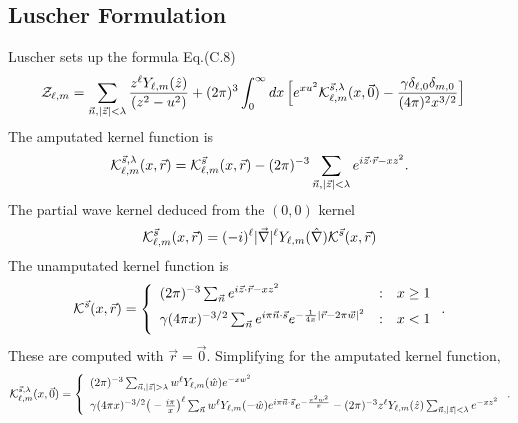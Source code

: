 \documentclass[a4paper]{article}
\begin{document}
\subsection{Luscher Formulation}

Luscher sets up the formula Eq.(C.8)
\begin{align}
 {\cal Z}_{\ell,m}
 &= \sum_{\vec{n},|\vec{z}|<\lambda} \frac{ z^{\ell} Y_{\ell,m}(\hat{z}) }{ (z^{2} - u^{2}) }
 + (2\pi)^{3} \int_{0}^{\infty} dx \,
 \Big[ e^{x u^{2}} {\cal K}_{\ell,m}^{\vec{s},\lambda}(x,\vec{0})
 - \frac{ \gamma \delta_{\ell,0} \delta_{m,0} }{ (4\pi)^{2} x^{3/2} } \Big]
\end{align}
The amputated kernel function is
\begin{align}
 {\cal K}_{\ell,m}^{\vec{s},\lambda}(x,\vec{r})
 = 
 {\cal K}_{\ell,m}^{\vec{s}}(x,\vec{r})
 - (2\pi)^{-3} \sum_{\vec{n},|\vec{z}|<\lambda} e^{ i\vec{z}\cdot\vec{r} - x z^{2} }.
\end{align}
The partial wave kernel deduced from the $(0,0)$ kernel
\begin{align}
 {\cal K}_{\ell,m}^{\vec{s}}(x,\vec{r})
 = (-i)^{\ell} |\vec{\nabla}|^{\ell} Y_{\ell,m}(\hat{\nabla}) {\cal K}^{\vec{s}}(x,\vec{r})
\end{align}
The unamputated kernel function is
\begin{align}
 {\cal K}^{\vec{s}}(x,\vec{r})
 = \left\{ \begin{array}{lll}
 (2\pi)^{-3} \sum_{\vec{n}} e^{ i\vec{z}\cdot\vec{r} - x z^{2} }
 &:& x \geq 1 \\[.5em]
 \gamma (4\pi x)^{-3/2} \sum_{\vec{n}} e^{i\pi \vec{n}\cdot\vec{s}}
 e^{ -\frac{1}{4x} |\vec{r}-2\pi\vec{w}|^{2} }
 &:& x < 1 \\[.5em]
 \end{array} \right..
\end{align}
These are computed with $\vec{r}=\vec{0}$.
Simplifying for the amputated kernel function,
\begin{align}
 {\cal K}_{\ell,m}^{\vec{s},\lambda}(x,\vec{0})
 = \left\{ \begin{array}{l}
 (2\pi)^{-3} \sum_{\vec{n},|\vec{z}|>\lambda} w^{\ell} Y_{\ell,m}(\hat{w}) e^{ - x w^{2} }
 \\[.5em]
 \gamma (4\pi x)^{-3/2} \big(-\frac{i\pi}{x}\big)^{\ell}
 \sum_{\vec{n}} w^{\ell} Y_{\ell,m}(-\hat{w}) e^{i\pi \vec{n}\cdot\vec{s}}
 e^{ -\frac{\pi^{2}w^{2}}{x} }
 - (2\pi)^{-3} z^{\ell} Y_{\ell,m}(\hat{z}) \sum_{\vec{n},|\vec{z}|<\lambda} e^{ - x z^{2} }
 \end{array} \right..
\end{align}
\end{document}
